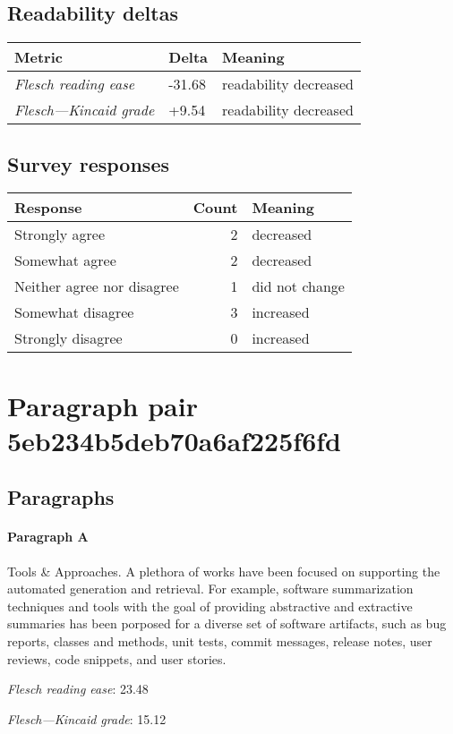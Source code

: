 \subsection{Readability deltas}

\begin{tabular}{lll}
\toprule
               \textbf{Metric} & \textbf{Delta} &       \textbf{Meaning} \\
\midrule
    \emph{Flesch reading ease} &         -31.68 &  readability decreased \\
 \emph{Flesch---Kincaid grade} &          +9.54 &  readability decreased \\
\bottomrule
\end{tabular}

\subsection{Survey responses}
\begin{tabular}{lrl}
\toprule
          \textbf{Response} &  \textbf{Count} & \textbf{Meaning} \\
\midrule
             Strongly agree &               2 &        decreased \\
             Somewhat agree &               2 &        decreased \\
 Neither agree nor disagree &               1 &   did not change \\
          Somewhat disagree &               3 &        increased \\
          Strongly disagree &               0 &        increased \\
\bottomrule
\end{tabular}

\section{Paragraph pair 5eb234b5deb70a6af225f6fd}
\subsection{Paragraphs}
\paragraph{Paragraph A}
Tools \& Approaches. A plethora of works have been focused on supporting the automated generation and retrieval. For example, software summarization techniques and tools with the goal of providing abstractive and extractive summaries has been porposed for a diverse set of software artifacts, such as bug reports, classes and methods, unit tests, commit messages, release notes, user reviews, code snippets, and user stories.\par\medskip
\emph{Flesch reading ease}: 23.48\par
\emph{Flesch---Kincaid grade}: 15.12

